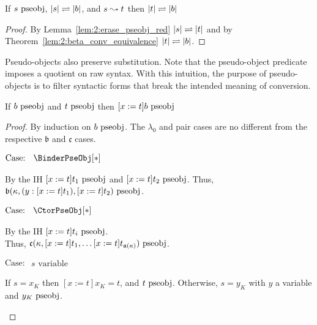 \begin{lemma}
    \label{lem:2:pseobj_red_f_step}
    If $s~\textnormal{pseobj}$, $|s| \rightleftharpoons |b|$, and $s \leadsto t$ then $|t| \rightleftharpoons |b|$
\end{lemma}
\begin{proof}
    By Lemma~\ref{lem:2:erase_pseobj_red} $|s| \rightleftharpoons |t|$ and by Theorem~\ref{lem:2:beta_conv_equivalence} $|t| \rightleftharpoons |b|$.
\end{proof}

Pseudo-objects also preserve substitution.
Note that the pseudo-object predicate imposes a quotient on raw syntax.
With this intuition, the purpose of pseudo-objects is to filter syntactic forms that break the intended meaning of conversion.

\begin{lemma}
    \label{lem:2:pseobj_subst}
    If $b~\textnormal{pseobj}$ and $t~\textnormal{pseobj}$ then $[x := t]b~\textnormal{pseobj}$
\end{lemma}
\begin{proof}
    By induction on $b~\textnormal{pseobj}$. The $\lambda_0$ and pair cases are no different from the respective $\mathfrak{b}$ and $\mathfrak{c}$ cases.

    $\text{Case: }\begin{array}{c} \BinderPseObj[*] \end{array}$
    \begin{proofcase}
        By the IH $[x := t]t_1~\textnormal{pseobj}$ and $[x := t]t_2~\textnormal{pseobj}$.
        Thus, $\mathfrak{b}(\kappa, (y : [x := t]t_1), [x := t]t_2)~\textnormal{pseobj}$.
    \end{proofcase}

    $\text{Case: }\begin{array}{c} \CtorPseObj[*] \end{array}$
    \begin{proofcase}
        By the IH $[x := t]t_i~\textnormal{pseobj}$. \\
        Thus, $\mathfrak{c}(\kappa, [x := t]t_1, \ldots [x := t]t_{\mathfrak{a}(\kappa)})~\textnormal{pseobj}$.
    \end{proofcase}

    $\text{Case: }\begin{array}{c} s\text{ variable} \end{array}$
    \begin{proofcase}
        If $s = x_K$ then $[x := t]x_K = t$, and $t~\textnormal{pseobj}$.
        Otherwise, $s = y_K$ with $y$ a variable and $y_K~\textnormal{pseobj}$.
    \end{proofcase}
\end{proof}

